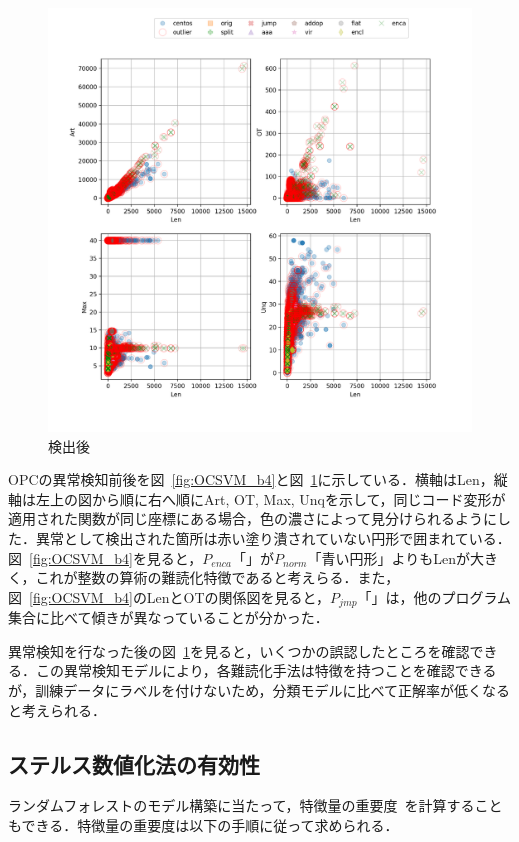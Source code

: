 \documentclass[12pt]{jarticle}
\begin{document}
\begin{figure}[bhtp]
  \includegraphics[width=17cm]{opc_OCSVM_all.pdf}
  \caption{検出後}
  \label{fig:OCSVM_af}
\end{figure}

OPCの異常検知前後を図~\ref{fig:OCSVM_b4}と図~\ref{fig:OCSVM_af}に示している．横軸はLen，縦軸は左上の図から順に右へ順にArt, OT, Max, Unqを示して，同じコード変形が適用された関数が同じ座標にある場合，色の濃さによって見分けられるようにした．異常として検出された箇所は赤い塗り潰されていない円形で囲まれている．図~\ref{fig:OCSVM_b4}を見ると，$P_{enca}$「」が$P_{norm}$「青い円形」よりもLenが大きく，これが整数の算術の難読化特徴であると考えらる．また，図~\ref{fig:OCSVM_b4}のLenとOTの関係図を見ると，$P_{jmp}$「」は，他のプログラム集合に比べて傾きが異なっていることが分かった．

異常検知を行なった後の図~\ref{fig:OCSVM_af}を見ると，いくつかの誤認したところを確認できる．この異常検知モデルにより，各難読化手法は特徴を持つことを確認できるが，訓練データにラベルを付けないため，分類モデルに比べて正解率が低くなると考えられる．

\subsection{ステルス数値化法の有効性}
ランダムフォレストのモデル構築に当たって，特徴量の重要度~\cite{featureSelection}\cite{forestImportances}を計算することもできる．特徴量の重要度は以下の手順に従って求められる．
\end{document}
